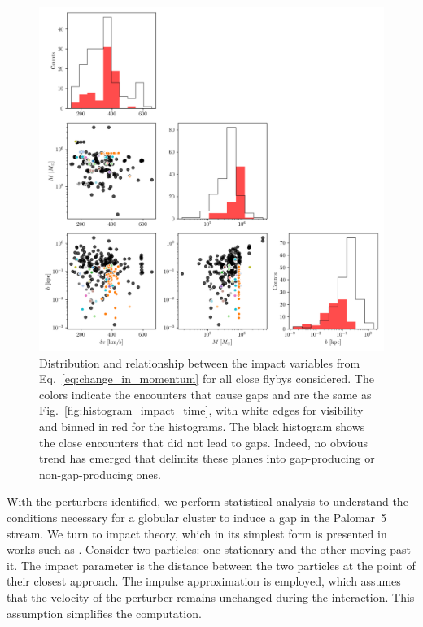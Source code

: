         \begin{figure}
            \centering
            \includegraphics[width=\linewidth]{images/impact_geometry_statistics.png}
            \caption[Distribution and relationship between the impact variables for all close flybys]{Distribution and relationship between the impact variables from Eq.~\ref{eq:change_in_momentum} for all close flybys considered. The colors indicate the encounters that cause gaps and are the same as Fig.~\ref{fig:histogram_impact_time}, with white edges for visibility and binned in red for the histograms. The black histogram shows the close encounters that did not lead to gaps. Indeed, no obvious trend has emerged that delimits these planes into gap-producing or non-gap-producing ones.}
            \label{fig:impact_geometry_statistics}    
        \end{figure}    

        With the perturbers identified, we perform statistical analysis to understand the conditions necessary for a globular cluster to induce a gap in the Palomar~5 stream. We turn to impact theory, which in its simplest form is presented in works such as \citet{2008gady.book.....B}. Consider two particles: one stationary and the other moving past it. The impact parameter is the distance between the two particles at the point of their closest approach. The impulse approximation is employed, which assumes that the velocity of the perturber remains unchanged during the interaction. This assumption simplifies the computation.

